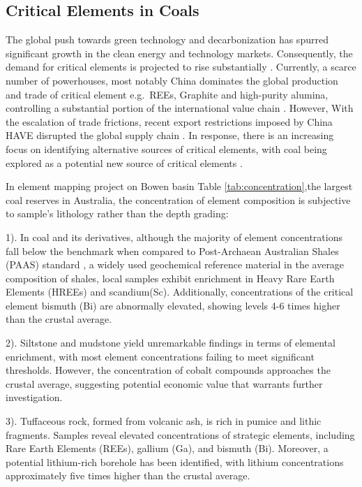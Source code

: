 \documentclass[11pt,a4paper,]{article}
\begin{document}
\hypertarget{critical-elements-in-coals}{%
\subsection{Critical Elements in Coals}\label{critical-elements-in-coals}}

The global push towards green technology and decarbonization has spurred significant growth in the clean energy and technology markets. Consequently, the demand for critical elements is projected to rise substantially \autocite{usde2017}. Currently, a scarce number of powerhouses, most notably China dominates the global production and trade of critical element e.g.~REEs, Graphite and high-purity alumina, controlling a substantial portion of the international value chain \autocite{us2024mineral,Coyne2023}. However, With the escalation of trade frictions, recent export restrictions imposed by China HAVE disrupted the global supply chain \autocite{MANCHERI2015262}. In response, there is an increasing focus on identifying alternative sources of critical elements, with coal being explored as a potential new source of critical elements \autocite{Hodgkinson2021}.

In \textcite{Hodgkinson2020} element mapping project on Bowen basin Table \ref{tab:concentration},the largest coal reserves in Australia, the concentration of element composition is subjective to sample's lithology rather than the depth grading:

1). In coal and its derivatives, although the majority of element concentrations fall below the benchmark when compared to Post-Archaean Australian Shales (PAAS) standard \autocite{McLennan2011}, a widely used geochemical reference material in the average composition of shales, local samples exhibit enrichment in Heavy Rare Earth Elements (HREEs) and scandium(Sc). Additionally, concentrations of the critical element bismuth (Bi) are abnormally elevated, showing levels 4-6 times higher than the crustal average.

2). Siltstone and mudstone yield unremarkable findings in terms of elemental enrichment, with most element concentrations failing to meet significant thresholds. However, the concentration of cobalt compounds approaches the crustal average, suggesting potential economic value that warrants further investigation.

3). Tuffaceous rock, formed from volcanic ash, is rich in pumice and lithic fragments. Samples reveal elevated concentrations of strategic elements, including Rare Earth Elements (REEs), gallium (Ga), and bismuth (Bi). Moreover, a potential lithium-rich borehole has been identified, with lithium concentrations approximately five times higher than the crustal average.
\end{document}
